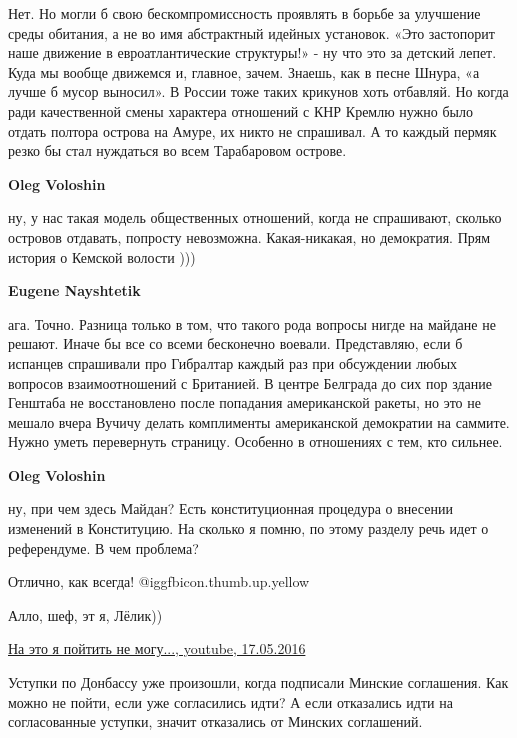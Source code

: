\begin{itemize}
\begin{itemize}
Нет. Но могли б свою бескомпромиссность проявлять в борьбе за улучшение среды
обитания, а не во имя абстрактный идейных установок. «Это застопорит наше
движение в евроатлантические структуры!» - ну что это за детский лепет. Куда мы
вообще движемся и, главное, зачем. Знаешь, как в песне Шнура, «а лучше б мусор
выносил». В России тоже таких крикунов хоть отбавляй. Но когда ради
качественной смены характера отношений с КНР Кремлю нужно было отдать полтора
острова на Амуре, их никто не спрашивал. А то каждый пермяк резко бы стал
нуждаться во всем Тарабаровом острове.

\textbf{Oleg Voloshin} 

ну, у нас такая модель общественных отношений, когда не спрашивают, сколько
островов отдавать, попросту невозможна. Какая-никакая, но демократия. Прям
история о Кемской волости )))

\textbf{Eugene Nayshtetik} 

ага. Точно. Разница только в том, что такого рода вопросы нигде на майдане не
решают. Иначе бы все со всеми бесконечно воевали. Представляю, если б испанцев
спрашивали про Гибралтар каждый раз при обсуждении любых вопросов
взаимоотношений с Британией. В центре Белграда до сих пор здание Генштаба не
восстановлено после попадания американской ракеты, но это не мешало вчера
Вучичу делать комплименты американской демократии на саммите. Нужно уметь
перевернуть страницу. Особенно в отношениях с тем, кто сильнее.

\textbf{Oleg Voloshin} 

ну, при чем здесь Майдан? Есть конституционная процедура о внесении изменений в
Конституцию. На сколько я помню, по этому разделу речь идет о референдуме. В
чем проблема?

\end{itemize} %

Отлично, как всегда!  @igg{fbicon.thumb.up.yellow} 

Алло, шеф, эт я, Лёлик))

\href{https://www.youtube.com/watch?v=q-PkF8VM0NU}{%
На это я пойтить не могу..., youtube, 17.05.2016%
}

Уступки по Донбассу уже произошли, когда подписали Минские соглашения.
Как можно не пойти, если уже согласились идти?
А если отказались идти на согласованные уступки, значит отказались от Минских соглашений.
\end{itemize} %
